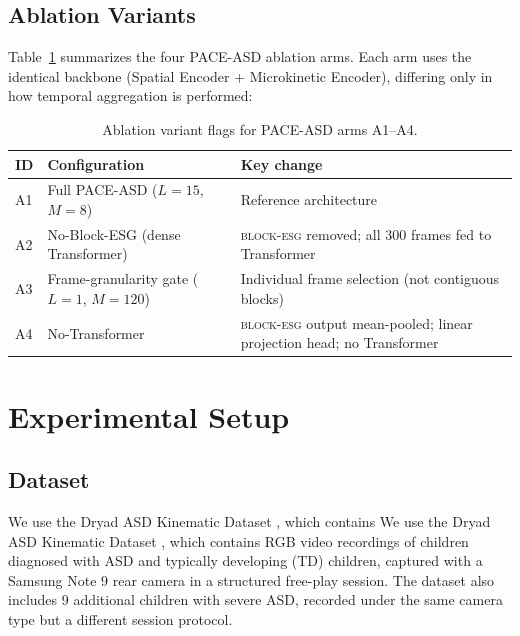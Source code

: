 \documentclass[a4paper,fleqn]{cas-sc}
\newcommand{\besg}{\textsc{block-esg}\xspace}
\begin{document}
\subsection{Ablation Variants}
\label{sec:method_ablation}

Table~\ref{tab:ablation_variants} summarizes the four PACE-ASD ablation arms.
Each arm uses the identical backbone (Spatial Encoder + Microkinetic Encoder),
differing only in how temporal aggregation is performed:

\begin{table}[h!]
  \centering
  \caption{Ablation variant flags for PACE-ASD arms A1--A4.}
  \label{tab:ablation_variants}
  \small
  \begin{tabularx}{\linewidth}{@{}l l X@{}}
    \toprule
    ID & Configuration & Key change \\
    \midrule
    A1 & Full PACE-ASD ($L=15$, $M=8$) & Reference architecture \\
    A2 & No-Block-ESG (dense Transformer) & \besg removed; all 300 frames fed to Transformer \\
    A3 & Frame-granularity gate ($L=1$, $M=120$) & Individual frame selection (not contiguous blocks) \\
    A4 & No-Transformer & \besg output mean-pooled; linear projection head; no Transformer \\
    \bottomrule
  \end{tabularx}
\end{table}

\section{Experimental Setup}
\label{sec:exp}

\subsection{Dataset}
\label{sec:exp_data}

We use the Dryad ASD Kinematic Dataset \citep{aljubouri2020}, which contains
We use the Dryad ASD Kinematic Dataset \citep{aljubouri2020}, which contains
RGB video recordings of children diagnosed with ASD and typically developing
(TD) children, captured with a Samsung Note 9 rear camera in a structured
free-play session.
The dataset also includes 9 additional children with severe ASD, recorded under
the same camera type but a different session protocol.
\end{document}
